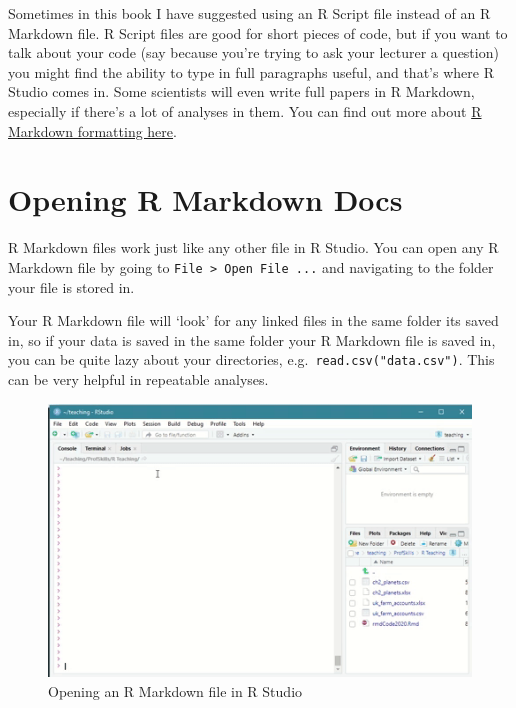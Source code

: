\documentclass[
]{book}
\begin{document}
Sometimes in this book I have suggested using an R Script file instead of an R Markdown file. R Script files are good for short pieces of code, but if you want to talk about your code (say because you're trying to ask your lecturer a question) you might find the ability to type in full paragraphs useful, and that's where R Studio comes in. Some scientists will even write full papers in R Markdown, especially if there's a lot of analyses in them. You can find out more about \href{https://rstudio.com/wp-content/uploads/2015/02/rmarkdown-cheatsheet.pdf}{R Markdown formatting here}.

\hypertarget{openrmd}{%
\section{Opening R Markdown Docs}\label{openrmd}}

R Markdown files work just like any other file in R Studio. You can open any R Markdown file by going to \texttt{File\ \textgreater{}\ Open\ File\ ...} and navigating to the folder your file is stored in.

Your R Markdown file will `look' for any linked files in the same folder its saved in, so if your data is saved in the same folder your R Markdown file is saved in, you can be quite lazy about your directories, e.g.~\texttt{read.csv("data.csv")}. This can be very helpful in repeatable analyses.

\begin{figure}

{\centering \includegraphics{images/06_workflows/openrmd} 

}

\caption{Opening an R Markdown file in R Studio}\label{fig:unnamed-chunk-106}
\end{figure}
\end{document}
